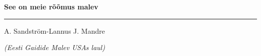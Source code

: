 \documentclass[12pt]{extbook}
\begin{document}
{
  \samepage
  \raggedbottom
  \raggedright
  \sloppy


  \vspace{0.2in}
    \centerline{
      \bfseries
      \large See on meie r\~o\~omus malev
    }
  \nopagebreak[4]
  \vspace{0.1in}
  \nopagebreak[4]
  \hrule height 0.05ex
  \nopagebreak[4]
  \vspace{-0.05in}

  {\footnotesize A. Sandstr\"om-Lannus \hfill J. Mandre }\\
  \vspace{0.01in}

  {\em {\footnotesize (Eesti Gaidide Malev USAs laul) } }
  \vspace{0.01in}


}
\end{document}

